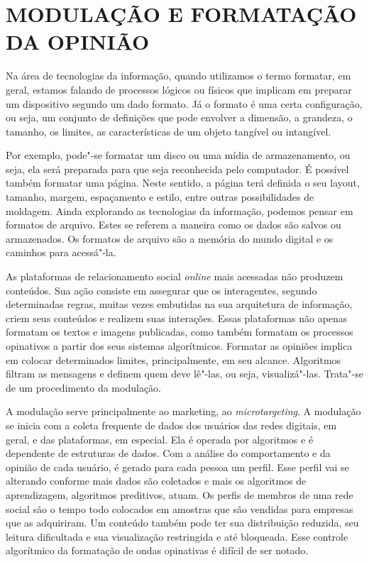 \section{MODULAÇÃO E FORMATAÇÃO DA OPINIÃO}

Na área de tecnologias da informação, quando utilizamos o termo
formatar, em geral, estamos falando de processos lógicos ou físicos que
implicam em preparar um dispositivo segundo um dado formato. Já o
formato é uma certa configuração, ou seja, um conjunto de definições que
pode envolver a dimensão, a grandeza, o tamanho, os limites, as
características de um objeto tangível ou intangível.

Por exemplo, pode"-se formatar um disco ou uma mídia de armazenamento, ou
seja, ela será preparada para que seja reconhecida pelo computador. É
possível também formatar uma página. Neste sentido, a página terá
definida o seu layout, tamanho, margem, espaçamento e estilo, entre
outras possibilidades de moldagem. Ainda explorando as tecnologias da
informação, podemos pensar em formatos de arquivo. Estes se referem a
maneira como os dados são salvos ou armazenados. Os formatos de arquivo
são a memória do mundo digital e os caminhos para acessá"-la.

As plataformas de relacionamento social \emph{online} mais acessadas não
produzem conteúdos. Sua ação consiste em assegurar que os interagentes,
segundo determinadas regras, muitas vezes embutidas na sua arquitetura
de informação, criem seus conteúdos e realizem suas interações. Essas
plataformas não apenas formatam os textos e imagens publicadas, como
também formatam os processos opinativos a partir dos seus sistemas
algorítmicos. Formatar as opiniões implica em colocar determinados
limites, principalmente, em seu alcance. Algoritmos filtram as mensagens
e definem quem deve lê"-las, ou seja, visualizá"-las. Trata"-se de um
procedimento da modulação.

A modulação serve principalmente ao marketing, ao \emph{microtargeting}.
A modulação se inicia com a coleta frequente de dados dos usuários das
redes digitais, em geral, e das plataformas, em especial. Ela é operada
por algoritmos e é dependente de estruturas de dados. Com a análise do
comportamento e da opinião de cada usuário, é gerado para cada pessoa um
perfil. Esse perfil vai se alterando conforme mais dados são coletados e
mais os algoritmos de aprendizagem, algoritmos preditivos, atuam. Os
perfis de membros de uma rede social são o tempo todo colocados em
amostras que são vendidas para empresas que as adquiriram. Um conteúdo
também pode ter sua distribuição reduzida, seu leitura dificultada e sua
visualização restringida e até bloqueada. Esse controle algorítmico da
formatação de ondas opinativas é difícil de ser notado.

